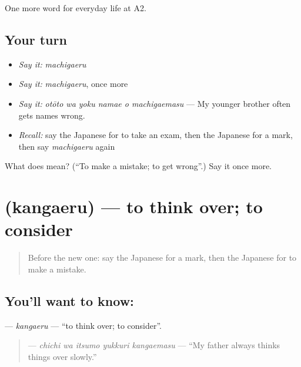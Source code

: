 \begin{grammarlens}[title={What you've built}]
One more word for everyday life at A2.
\end{grammarlens}

\subsection*{Your turn}
\begin{itemize}
\raggedright
  \item \emph{Say it:} \emph{machigaeru}
  \item \emph{Say it:} \emph{machigaeru}, once more
  \item \emph{Say it:} \emph{otōto wa yoku namae o machigaemasu} — My younger brother often gets names wrong.
  \item \emph{Recall:} say the Japanese for to take an exam, then the Japanese for a mark, then say \emph{machigaeru} again
\end{itemize}

\begin{tcolorbox}[breakable,colback=teal!4,colframe=teal!35!black,title={Before you move on}]
What does  mean? (\textquotedblleft{}To make a mistake; to get wrong\textquotedblright{}.) Say it once more.
\end{tcolorbox}
\section[\texorpdfstring{\ja{かんがえる} (kangaeru)}{かんがえる (kangaeru)}]{ (kangaeru) — to think over; to consider}

\label{lesson:JA-C227-kangaeru}



\begin{quote}
Before the new one: say the Japanese for a mark, then the Japanese for to make a mistake.
\end{quote}

\subsection*{You'll want to know: }
\textbf{} — \emph{kangaeru} — \textquotedblleft{}to think over; to consider\textquotedblright{}.

\begin{quote}
\textbf{   } — \emph{chichi wa itsumo yukkuri kangaemasu} — \textquotedblleft{}My father always thinks things over slowly.\textquotedblright{}
\end{quote}

